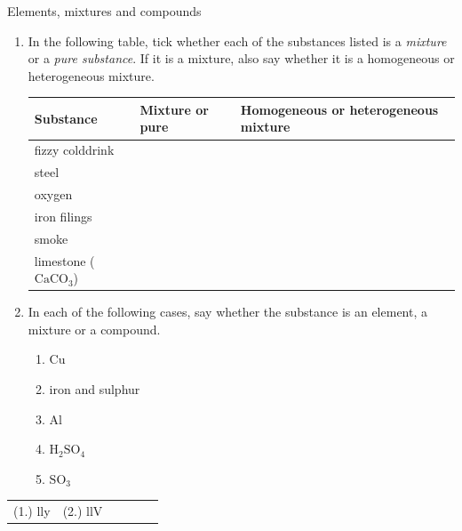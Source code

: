             \begin{exercises}{Elements, mixtures and compounds}{
            \nopagebreak \noindent \vspace{-2cm}
            \label{m38708*id63472}
 \begin{enumerate}[noitemsep, label=\textbf{\arabic*}. ] 
    \item In the following table, tick whether each of the substances listed is a \textsl{mixture} or a \textsl{pure substance}. If it is a mixture, also say whether it is a homogeneous or heterogeneous mixture.
          \begin{table}[H]
        \begin{center}
    \noindent
      \begin{tabular}{|l|l|l|}\hline
        \textbf{Substance} &
        \textbf{Mixture or pure} &
        \textbf{Homogeneous or heterogeneous mixture} \\ \hline
        fizzy colddrink & & \\ \hline
        steel & & \\ \hline
        oxygen & & \\ \hline
        iron filings & & \\ \hline
        smoke & & \\ \hline
        limestone (${\text{CaCO}}_{3}$) & & \\ \hline
    \end{tabular}
      \end{center}
\end{table}

\label{m38708*uid29}\item In each of the following cases, say whether the substance is an element, a mixture or a compound.
\begin{multicols}{3}
\begin{enumerate}[noitemsep, label=\textbf{\alph*}. ] 
\item $\text{Cu}$
\item iron and sulphur
\item $\text{Al}$
\item $\text{H}_{2}\text{SO}_{4}$
\item $\text{SO}_{3}$
\end{enumerate}
\end{multicols}
                \end{enumerate}
\practiceinfo
\par 
 \par \begin{tabular}[h]{cccccc}
 (1.) lly  &  (2.) llV  & \end{tabular}
}
\end{exercises}
